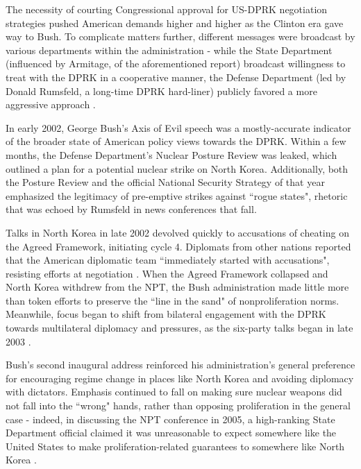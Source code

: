 \documentclass{article}
\begin{document}
The necessity of courting Congressional approval for US-DPRK negotiation strategies pushed American demands higher and higher as the Clinton era gave way to Bush. To complicate matters further, different messages were broadcast by various departments within the administration - while the State Department (influenced by Armitage, of the aforementioned report) broadcast willingness to treat with the DPRK in a cooperative manner, the Defense Department (led by Donald Rumsfeld, a long-time DPRK hard-liner\cite{rumsfeld}) publicly favored a more aggressive approach \cite{harnisch}.

In early 2002, George Bush's Axis of Evil speech was a mostly-accurate indicator of the broader state of American policy views towards the DPRK. Within a few months, the Defense Department's Nuclear Posture Review was leaked, which outlined a plan for a potential nuclear strike on North Korea\cite{npreview}. Additionally, both the Posture Review and the official National Security Strategy of that year emphasized the legitimacy of pre-emptive strikes against ``rogue states"\cite{bleiker}, rhetoric that was echoed by Rumsfeld in news conferences that fall\cite{harnisch}.

Talks in North Korea in late 2002 devolved quickly to accusations of cheating on the Agreed Framework, initiating cycle 4. Diplomats from other nations reported that the American diplomatic team ``immediately started with accusations", resisting efforts at negotiation \cite{bleiker}. When the Agreed Framework collapsed and North Korea withdrew from the NPT, the Bush administration made little more than token efforts to preserve the ``line in the sand" of nonproliferation norms\cite{huntley}. Meanwhile, focus began to shift from bilateral engagement with the DPRK towards multilateral diplomacy and pressures, as the six-party talks began in late 2003 \cite{crs13}.

Bush's second inaugural address reinforced his administration's general preference for encouraging regime change in places like North Korea and avoiding diplomacy with dictators. Emphasis continued to fall on making sure nuclear weapons did not fall into the ``wrong" hands, rather than opposing proliferation in the general case - indeed, in discussing the NPT conference in 2005, a high-ranking State Department official claimed it was unreasonable to expect somewhere like the United States to make proliferation-related guarantees to somewhere like North Korea \cite{huntley}.
\end{document}

